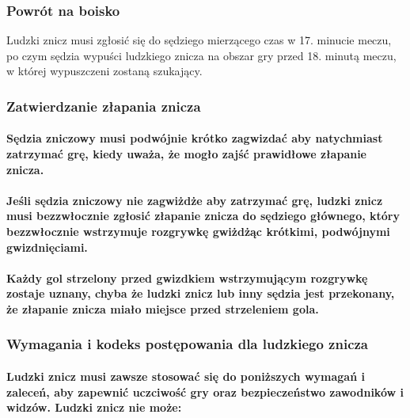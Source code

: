 \documentclass[12pt]{article}
\begin{document}
\subsubsection{Powrót na boisko}

Ludzki znicz musi zgłosić się do sędziego mierzącego czas w 17. minucie
meczu, po czym sędzia wypuści ludzkiego znicza na obszar gry przed 18.
minutą meczu, w której wypuszczeni zostaną szukający.

\subsubsection{Zatwierdzanie złapania znicza}

\paragraph{Sędzia zniczowy musi podwójnie krótko zagwizdać aby
	natychmiast zatrzymać grę, kiedy uważa, że mogło zajść prawidłowe
	złapanie znicza.}

\paragraph{Jeśli sędzia zniczowy nie zagwiżdże aby zatrzymać grę,
	ludzki znicz musi bezzwłocznie zgłosić złapanie znicza do sędziego
	głównego, który bezzwłocznie wstrzymuje rozgrywkę gwiżdżąc krótkimi,
	podwójnymi gwizdnięciami.}

\paragraph{Każdy gol strzelony przed gwizdkiem wstrzymującym
	rozgrywkę zostaje uznany, chyba że ludzki znicz lub inny sędzia jest
	przekonany, że złapanie znicza miało miejsce przed strzeleniem gola.}

\subsubsection{Wymagania i kodeks postępowania dla ludzkiego znicza}

\paragraph{Ludzki znicz musi zawsze stosować się do poniższych
	wymagań i zaleceń, aby zapewnić uczciwość gry oraz bezpieczeństwo
	zawodników i widzów. Ludzki znicz nie może:}
\end{document}

